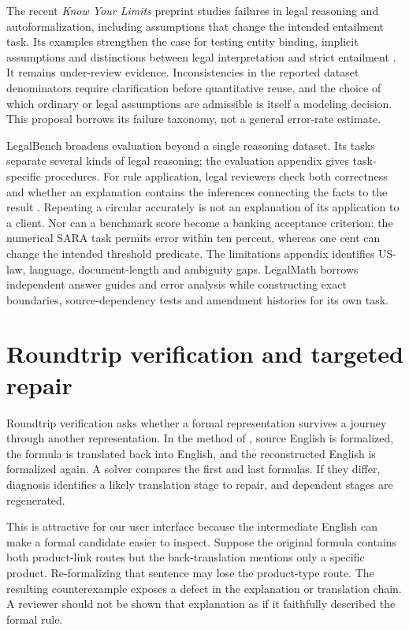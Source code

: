 \documentclass[12pt,a4paper,oneside,openany]{book}
\begin{document}
The recent \emph{Know Your Limits} preprint studies failures in legal reasoning
and autoformalization, including assumptions that change the intended entailment
task. Its examples strengthen the case for testing entity binding, implicit
assumptions and distinctions between legal interpretation and strict entailment
\citep[secs.~3--5]{limits2026}. It remains under-review evidence. Inconsistencies
in the reported dataset denominators require clarification before quantitative
reuse, and the choice of which ordinary or legal assumptions are admissible is
itself a modeling decision. This proposal borrows its failure taxonomy, not a
general error-rate estimate.

LegalBench broadens evaluation beyond a single reasoning dataset. Its tasks
separate several kinds of legal reasoning; the evaluation appendix gives
task-specific procedures. For rule application, legal reviewers check both
correctness and whether an explanation contains the inferences connecting the
facts to the result \citep[sec.~3 and evaluation appendix]{legalbench2023}.
Repeating a circular accurately is not an explanation of its application to a
client. Nor can a benchmark score become a banking acceptance criterion: the
numerical SARA task permits error within ten percent, whereas one cent can change
the intended threshold predicate. The limitations appendix identifies US-law,
language, document-length and ambiguity gaps. LegalMath borrows independent
answer guides and error analysis while constructing exact boundaries,
source-dependency tests and amendment histories for its own task.

\section{Roundtrip verification and targeted repair}
\label{merge:M04:11}

\label{sec:languages-roundtrip}
Roundtrip verification asks whether a formal representation survives a journey
through another representation. In the method of \citet{roundtrip2026}, source
English is formalized, the formula is translated back into English, and the
reconstructed English is formalized again. A solver compares the first and
last formulas. If they differ, diagnosis identifies a likely translation
stage to repair, and dependent stages are regenerated.

This is attractive for our user interface because the intermediate English
can make a formal candidate easier to inspect. Suppose the original formula
contains both product-link routes but the back-translation mentions only a
specific product. Re-formalizing that sentence may lose the product-type
route. The resulting counterexample exposes a defect in the explanation or
translation chain. A reviewer should not be shown that explanation as if it
faithfully described the formal rule.
\end{document}

